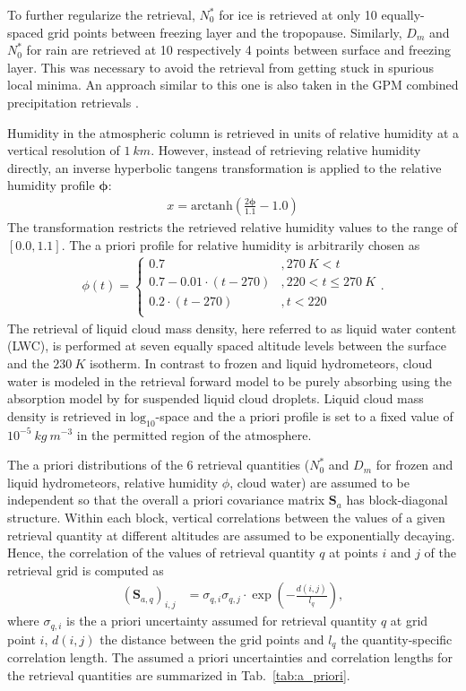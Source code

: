 \documentclass[journal abbreviation, manuscript]{copernicus}
\begin{document}
To further regularize the retrieval, $N_0^*$ for ice is retrieved at only 10
equally-spaced grid points between freezing layer and the tropopause. Similarly,
$D_m$ and $N_0^*$ for rain are retrieved at 10 respectively 4 points between surface and
freezing layer. This was necessary to avoid the retrieval from getting stuck in
spurious local minima. An approach similar to this one is also taken in the GPM
combined precipitation retrievals \citep{grecu16}.

Humidity in the atmospheric column is retrieved in units of relative humidity at
a vertical resolution of $1\ \unit{km}$. However, instead of retrieving relative
humidity directly, an inverse hyperbolic tangens transformation is applied to
the relative humidity profile $\mathbf{\phi}$:
%
\begin{align}
x = \text{arctanh}(\frac{2 \mathbf{\phi}}{1.1} - 1.0)
\end{align}
%
The transformation restricts the retrieved relative humidity values to
the range of $[0.0, 1.1]$. The a priori profile for relative humidity
is arbitrarily chosen as
%
\begin{align}
\phi(t) = \begin{cases}
 0.7 &, 270\ \unit{K} < t \\
 0.7 - 0.01 \cdot (t - 270) & ,220 < t \leq  270\ \unit{K} \\
 0.2 \cdot (t - 270) & ,t < 220 \\
 \end{cases}.
\end{align}
%
The retrieval of liquid cloud mass density, here referred to as liquid water
content (LWC), is performed at seven equally spaced altitude levels between the
surface and the $230\ \unit{K}$ isotherm. In contrast to frozen and liquid
hydrometeors, cloud water is modeled in the retrieval forward model to be purely
absorbing using the absorption model by \cite{liebe93} for suspended liquid
cloud droplets. Liquid cloud mass density is retrieved in
$\text{log}_{10}$-space and the a priori profile is set to a fixed value of
$10^{-5}\ \unit{kg\ m^{-3}}$ in the permitted region of the atmosphere.

The a priori distributions of the 6 retrieval quantities ($N_0^*$ and $D_m$ for
frozen and liquid hydrometeors, relative humidity $\phi$, cloud water) are
assumed to be independent so that the overall a priori covariance matrix
$\mathbf{S}_a$ has block-diagonal structure. Within each block, vertical
correlations between the values of a given retrieval quantity at different
altitudes are assumed to be exponentially decaying. Hence, the correlation of
the values of retrieval quantity $q$ at points $i$ and $j$ of the retrieval grid
is computed as
%
\begin{align}
\left ( \mathbf{S}_{a,q} \right )_{i, j} &= \sigma_{q,i} \sigma_{q,j}
 \cdot \exp  \left ( -\frac{d(i, j)}{l_q} \right ),
\end{align}
%
where $\sigma_{q, i}$ is the a priori uncertainty assumed for retrieval
quantity $q$ at grid point $i$, $d(i, j)$ the distance between the grid
points and $l_q$ the quantity-specific correlation length. The assumed
a priori uncertainties and correlation lengths for the retrieval quantities
are summarized in Tab.~\ref{tab:a_priori}.
\end{document}
